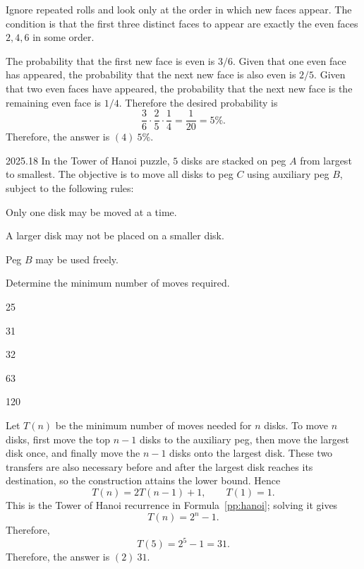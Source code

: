     \begin{solution}
        Ignore repeated rolls and look only at the order in which new faces appear. The condition is
        that the first three distinct faces to appear are exactly the even faces $2,4,6$ in some
        order.

        The probability that the first new face is even is $3/6$. Given that one even face has
        appeared, the probability that the next new face is also even is $2/5$. Given that two even
        faces have appeared, the probability that the next new face is the remaining even face is
        $1/4$. Therefore the desired probability is
        \[
            \frac36\cdot\frac25\cdot\frac14
            =
            \frac1{20}
            =
            5\%.
        \]
        Therefore, the answer is $\boxed{(4)\ 5\%}$.
    \end{solution}

    \begin{pastproblem}{2025.18}
        In the Tower of Hanoi puzzle, $5$ disks are stacked on peg $A$ from largest to smallest.
        The objective is to move all disks to peg $C$ using auxiliary peg $B$, subject to the
        following rules:
        \begin{problemchoices}
            \item Only one disk may be moved at a time.
            \item A larger disk may not be placed on a smaller disk.
            \item Peg $B$ may be used freely.
        \end{problemchoices}
        Determine the minimum number of moves required.
        \begin{problemchoices}
            \item 25
            \item 31
            \item 32
            \item 63
            \item 120
        \end{problemchoices}
    \end{pastproblem}

    \begin{solution}
        Let $T(n)$ be the minimum number of moves needed for $n$ disks. To move $n$ disks, first
        move the top $n-1$ disks to the auxiliary peg, then move the largest disk once, and finally
        move the $n-1$ disks onto the largest disk. These two transfers are also necessary before and after the largest disk reaches its destination, so the construction attains the lower bound. Hence
        \[
            T(n)=2T(n-1)+1,
            \qquad
            T(1)=1.
        \]
        This is the Tower of Hanoi recurrence in Formula~\ref{pp:hanoi}; solving it gives
        \[
            T(n)=2^n-1.
        \]
        Therefore,
        \[
            T(5)=2^5-1=31.
        \]
        Therefore, the answer is $\boxed{(2)\ 31}$.
    \end{solution}

